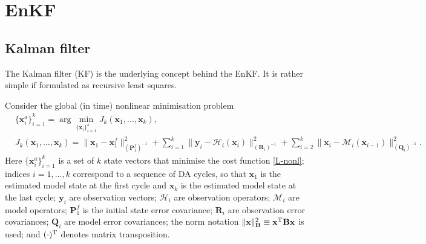 \documentclass[11pt]{report}
\newcommand{\mb} {\mathbf}
\newcommand{\T}{^{\tiny \mathrm T}}
\begin{document}
\chapter{EnKF}
\label{ch:enkf}

\section{Kalman filter}

The Kalman filter (KF) is the underlying concept behind the EnKF.
It is rather simple if formulated as recursive least squares.

Consider the global (in time) nonlinear minimisation problem
\begin{align}
  \label{min-nonl}
  &\{\mb x_i^a\}_{i=1}^k = \arg \underset{\{\mb x_i\}_{i = 1}^k}\min J_k(\mb x_1, \dots, \mb x_k),\\
  &J_k(\mb x_1, \dots, \mb x_k)  = \|\mb x_1 - \mb x_1^f\|^2_{(\mb P_1^f)^{-1}}
  + \sum_{i = 1}^k \|\mb y_i - \mathcal H_i(\mb x_i)\|^2_{(\mb R_i)^{-1}}
  + \sum_{i = 2}^k \|\mb x_i - \mathcal M_i(\mb x_{i-1})\|^2_{(\mb Q_i)^{-1}}.
  \label{L-nonl}
\end{align}
Here $\{\mb x_i^a\}_{i=1}^k$ is a set of $k$ state vectors that minimise the cost function \eqref{L-nonl}; indices $i = 1,\dots,k$ correspond to a sequence of DA cycles, so that $\mb x_1$ is the estimated model state at the first cycle and $\mb x_k$ is the estimated model state at the last cycle; $\mb y_i$ are observation vectors; $\mathcal H_i$ are observation operators; $\mathcal M_i$ are model operators; $\mb P_1^f$ is the initial state error covariance; $\mb R_i$ are observation error covariances; $\mb Q_i$ are model error covariances; the norm notation $\|\mb x\|^2_{\mb B} \equiv \mb x\T \mb B \mb x$ is used; and $(\cdot)\T$ denotes matrix transposition.
\end{document}
